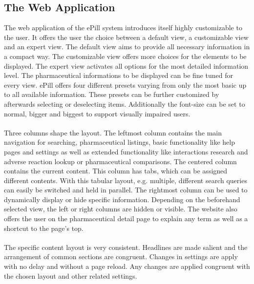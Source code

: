 \subsection{The Web Application}
The web application of the ePill system introduces itself highly customizable to the user. It offers the user the choice between a default view, a customizable view and an expert view. The default view aims to provide all necessary information in a compact way. The customizable view offers more choices for the elements to be displayed. The expert view activates all options for the most detailed information level. The pharmaceutical informations to be displayed can be fine tuned for every view. ePill offers four different presets varying from only the most basic up to all available information. These presets can be further customized by afterwards selecting or deselecting items. Additionally the font-size can be set to normal, bigger and biggest to support visually impaired users.
\\
\\
Three columns shape the layout. The leftmost column contains the main navigation for searching, pharmaceutical listings, basic functionality like help pages and settings as well as extended functionality like interactions research and adverse reaction lookup or pharmaceutical comparisons. The centered column contains the current content. This column has tabs, which can be assigned different contents. With this tabular layout, e.g. multiple, different search queries can easily be switched and held in parallel. The rightmost column can be used to dynamically display or hide specific information. Depending on the beforehand selected view, the left or right columns are hidden or visible. The website also offers the user on the pharmaceutical detail page to explain any term as well as a shortcut to the page's top.
\\
\\
The specific content layout is very consistent. Headlines are made salient and the arrangement of common sections are congruent. Changes in settings are apply with no delay and without a page reload. Any changes are applied congruent with the chosen layout and other related settings.